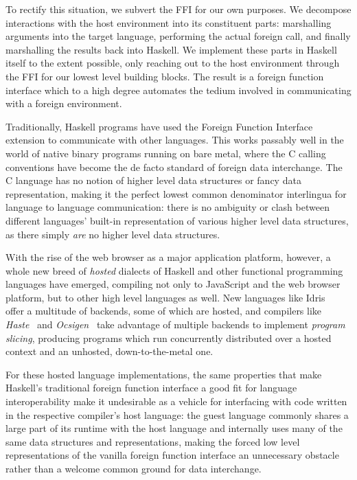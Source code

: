 \documentclass[preprint]{sigplanconf}
\begin{document}
To rectify this situation, we subvert the FFI for our own purposes. We decompose
interactions with the host environment into its constituent parts: marshalling
arguments into the target language, performing the actual foreign call, and
finally marshalling the results back into Haskell.
We implement these parts in Haskell itself to the extent possible,
only reaching out to the host environment through the FFI for our lowest level
building blocks. The result is a foreign function interface which to a high
degree automates the tedium involved in communicating with a foreign
environment.

Traditionally, Haskell programs have used the Foreign Function Interface
extension to communicate with other languages. This works
passably well in the world of native binary programs running on bare metal,
where the C calling conventions have become the de facto standard of foreign
data interchange.
The C language has no notion of higher level data structures or
fancy data representation, making it the perfect lowest common denominator
interlingua for language to language communication:
there is no ambiguity or clash between different languages' built-in
representation of various higher level data structures, as there simply
\emph{are} no higher level data structures.

With the rise of the web browser as a major application platform, however,
a whole new breed of \emph{hosted} dialects of Haskell and other functional
programming languages have emerged, compiling not only to JavaScript and the
web browser platform, but to other high level languages as well.
New languages like Idris\ \cite{idris} offer a multitude of backends,
some of which are hosted, and compilers like \emph{Haste}\ \cite{haste} and
\emph{Ocsigen}\ \cite{ocsigen} take advantage of multiple backends to
implement \emph{program slicing}, producing programs which run concurrently
distributed over a hosted context and an unhosted, down-to-the-metal one.

For these hosted language implementations, the same properties that make
Haskell's traditional foreign function interface a good fit for language
interoperability make it undesirable as a vehicle for interfacing with
code written in the respective compiler's host language: the guest language
commonly shares a large part of its runtime with the host language and
internally uses many of the same data structures and representations, making
the forced low level representations of the vanilla foreign function interface
an unnecessary obstacle rather than a welcome common ground for data
interchange.
\end{document}
